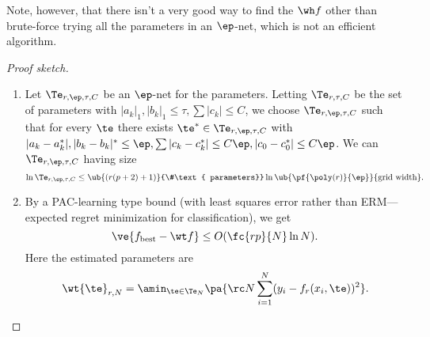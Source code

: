 Note, however, that there isn't a very good way to find the $\wh f$ other than brute-force trying all the parameters in an $\ep$-net, which is not an efficient algorithm.

\begin{proof}[Proof sketch]
\begin{enumerate}
\item
Let $\Te_{r,\ep,\tau,C}$ be an $\ep$-net for the parameters. Letting $\Te_{r,\tau,C}$ be the set of parameters with $|a_k|_1,|b_k|_1\le \tau, \sum|c_k|\le C$, we choose $\Te_{r,\ep,\tau,C}$ such that for every $\te$ there exists $\te^*\in \Te_{r,\ep,\tau,C}$ with $|a_k-a_k^*|,|b_k-b_k|^*\le \ep, \sum|c_k-c^*_k|\le C\ep, |c_0-c_0^*|\le C\ep$. We can $\Te_{r,\ep,\tau,C}$ having size
\[
\ln \Te_{r,\ep,\tau,C} \le \ub{(r(p+2)+1)}{\#\text{ parameters}} \ln\ub{ \pf{\poly(r)}{\ep}}{\text{grid width}}.
\]
\item
By a PAC-learning type bound (with least squares error rather than ERM---expected regret minimization for classification), we get
\[
\ve{f_{\text{best}}-\wt f} \le O(\fc{rp}{N} \ln N).
\]
Here the estimated parameters are
\[
\wt{\te}_{r,N} = \amin_{\te\in \Te_N} \pa{\rc N \sum_{i=1}^N (y_i-f_r(x_i,\te))^2}.
\]
\end{enumerate}
\end{proof}